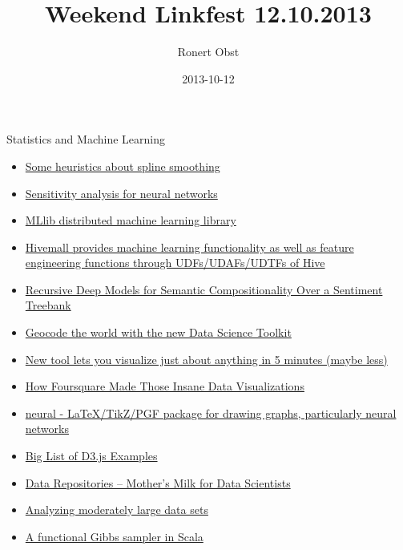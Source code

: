 \documentclass[presentation]{beamer}
\author{Ronert Obst}
\date{2013-10-12}
\title{Weekend Linkfest 12.10.2013}
\begin{document}
\maketitle

\begin{frame}[fragile,label=sec-1]{Statistics and Machine Learning}
\begin{itemize}
\item \href{http://freakonometrics.hypotheses.org/9184}{Some heuristics about spline smoothing}
\item \href{http://beckmw.wordpress.com/2013/10/07/sensitivity-analysis-for-neural-networks/}{Sensitivity analysis for neural networks}
\item \href{http://mloss.org/revision/view/1428/}{MLlib distributed machine learning library}
\item \href{http://mloss.org/revision/view/1425/}{Hivemall provides machine learning functionality as well as feature engineering functions through UDFs/UDAFs/UDTFs of Hive}
\item \href{http://nlp.stanford.edu/sentiment/index.html}{Recursive Deep Models for Semantic Compositionality Over a Sentiment Treebank}
\item \href{http://petewarden.com/2013/10/06/geocode-the-world-with-the-new-data-science-toolkit/}{Geocode the world with the new Data Science Toolkit}
\item \href{http://gigaom.com/2013/10/08/new-tool-lets-you-visualize-just-about-anything-in-5-minutes-maybe-less/}{New tool lets you visualize just about anything in 5 minutes (maybe less)}
\item \href{http://www.fastcolabs.com/3019608/how-foursquare-made-those-insane-data-visualizations}{How Foursquare Made Those Insane Data Visualizations}
\item \href{https://github.com/battlesnake/neural}{neural - \LaTeX{}/TikZ/PGF package for drawing graphs, particularly neural networks}
\item \href{http://christopheviau.com/d3list/}{Big List of D3.js Examples}
\item \href{http://datascientistinsights.com/2013/10/07/data-repositories-mothers-milk-for-data-scientists/}{Data Repositories – Mother’s Milk for Data Scientists}
\item \href{http://faculty.washington.edu/tlumley/tutorials/user-biglm.pdf}{Analyzing moderately large data sets}
\item \href{http://darrenjw.wordpress.com/2013/10/04/a-functional-gibbs-sampler-in-scala/}{A functional Gibbs sampler in Scala}
\end{itemize}
\end{frame}
\end{document}
